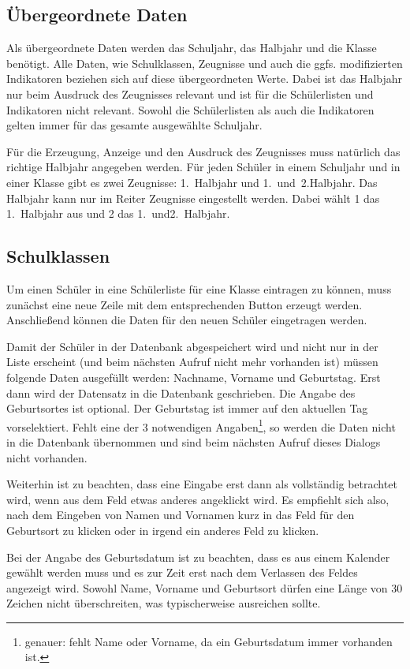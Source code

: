 \documentclass[a4paper,notitlepage,parskip]{scrartcl}
\newcommand\ott{\normalfont\ttfamily}
\begin{document}
\subsection{Übergeordnete Daten}
Als übergeordnete Daten werden das Schuljahr, das Halbjahr und die Klasse benötigt.
Alle Daten, wie Schulklassen, Zeugnisse und auch die ggfs. modifizierten Indikatoren beziehen sich auf diese übergeordneten Werte. Dabei ist das Halbjahr nur beim Ausdruck des Zeugnisses relevant und ist für die Schülerlisten und Indikatoren nicht relevant. Sowohl die Schülerlisten als auch die Indikatoren gelten immer für das gesamte ausgewählte Schuljahr.

Für die Erzeugung, Anzeige und den Ausdruck des Zeugnisses muss natürlich das richtige Halbjahr angegeben werden.
Für jeden Schüler in einem Schuljahr und in einer Klasse gibt es zwei Zeugnisse: 1.~Halbjahr und 1.~und~2.Halbjahr. Das Halbjahr kann nur im Reiter {\ott Zeugnisse} eingestellt werden. Dabei wählt 1 das 1.~Halbjahr aus und 2 das 1.~und2.~Halbjahr.

\subsection{Schulklassen}

Um einen Schüler in eine Schülerliste für eine Klasse eintragen zu können, muss zunächst eine neue Zeile mit dem entsprechenden Button erzeugt werden. Anschließend können die Daten für den neuen Schüler eingetragen werden. 

Damit der Schüler in der Datenbank abgespeichert wird und nicht nur in der Liste erscheint (und beim nächsten Aufruf nicht mehr vorhanden ist) müssen folgende Daten ausgefüllt werden: {\ott Nachname}, {\ott Vorname} und {\ott Geburtstag}. Erst dann wird der Datensatz in die Datenbank geschrieben. Die Angabe des Geburtsortes ist optional. Der {\ott Geburtstag} ist immer auf den aktuellen Tag vorselektiert.
Fehlt eine der 3 notwendigen Angaben\footnote{genauer: fehlt Name oder Vorname, da ein Geburtsdatum immer vorhanden ist.}, so werden die Daten nicht in die Datenbank übernommen und sind beim nächsten Aufruf dieses Dialogs nicht vorhanden.

Weiterhin ist zu beachten, dass eine Eingabe erst dann als vollständig betrachtet wird, wenn aus dem Feld etwas anderes angeklickt wird. Es empfiehlt sich also, nach dem Eingeben von Namen und Vornamen kurz in das Feld für den Geburtsort zu klicken oder in irgend ein anderes Feld zu klicken.

Bei der Angabe des Geburtsdatum ist zu beachten, dass es aus einem Kalender gewählt werden muss und es zur Zeit erst nach dem Verlassen des Feldes angezeigt wird.
Sowohl Name, Vorname und Geburtsort dürfen eine Länge von 30 Zeichen nicht überschreiten, was typischerweise ausreichen sollte. 
\end{document}
